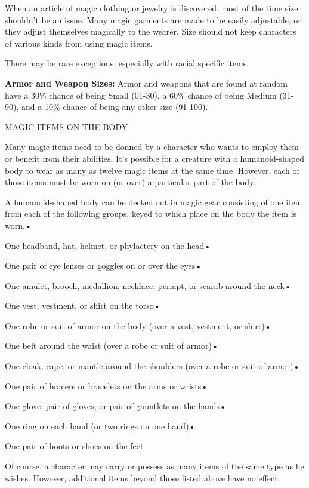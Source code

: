 When an article of magic clothing or jewelry is discovered, most of the time size 
shouldn't be an issue. Many magic garments are made to be easily adjustable, or 
they adjust themselves magically to the wearer. Size should not keep characters 
of various kinds from using magic items.

There may be rare exceptions, especially with racial specific items. 

\textbf{Armor and Weapon Sizes: }Armor and weapons that are found at random have 
a 30\% chance of being Small (01-30), a 60\% chance of being Medium (31-90), and 
a 10\% chance of being any other size (91-100).

\vspace{12pt}
{\large MAGIC ITEMS ON THE BODY}

Many magic items need to be donned by a character who wants to employ them or benefit 
from their abilities. It's possible for a creature with a humanoid-shaped body 
to wear as many as twelve magic items at the same time. However, each of those 
items must be worn on (or over) a particular part of the body.

A humanoid-shaped body can be decked out in magic gear consisting of one item from 
each of the following groups, keyed to which place on the body the item is worn.•

One headband, hat, helmet, or phylactery on the head•

One pair of eye lenses or goggles on or over the eyes•

One amulet, brooch, medallion, necklace, periapt, or scarab around the neck•

One vest, vestment, or shirt on the torso•

One robe or suit of armor on the body (over a vest, vestment, or shirt)•

One belt around the waist (over a robe or suit of armor)•

One cloak, cape, or mantle around the shoulders (over a robe or suit of armor)•

One pair of bracers or bracelets on the arms or wrists•

One glove, pair of gloves, or pair of gauntlets on the hands•

One ring on each hand (or two rings on one hand)•

One pair of boots or shoes on the feet

Of course, a character may carry or possess as many items of the same type as he 
wishes. However, additional items beyond those listed above have no effect. 

